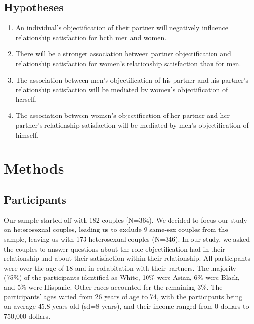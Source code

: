 \documentclass[
  man]{apa6}
\begin{document}
\hypertarget{hypotheses}{%
\subsection{Hypotheses}\label{hypotheses}}

\begin{enumerate}
\def\labelenumi{\arabic{enumi}.}
\item
  An individual's objectification of their partner will negatively influence relationship satisfaction for both men and women.
\item
  There will be a stronger association between partner objectification and relationship satisfaction for women's relationship satisfaction than for men.
\item
  The association between men's objectification of his partner and his partner's relationship satisfaction will be mediated by women's objectification of herself.
\item
  The association between women's objectification of her partner and her partner's relationship satisfaction will be mediated by men's objectification of himself.
\end{enumerate}

\hypertarget{methods}{%
\section{Methods}\label{methods}}

\hypertarget{participants}{%
\subsection{Participants}\label{participants}}

Our sample started off with 182 couples (N=364). We decided to focus our study on heterosexual couples, leading us to exclude 9 same-sex couples from the sample, leaving us with 173 heterosexual couples (N=346). In our study, we asked the couples to answer questions about the role objectification had in their relationship and about their satisfaction within their relationship. All participants were over the age of 18 and in cohabitation with their partners. The majority (75\%) of the participants identified as White, 10\% were Asian, 6\% were Black, and 5\% were Hispanic. Other races accounted for the remaining 3\%. The participants' ages varied from 26 years of age to 74, with the participants being on average 45.8 years old (sd=8 years), and their income ranged from 0 dollars to 750,000 dollars.
\end{document}
